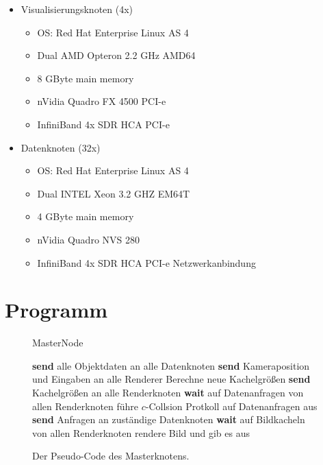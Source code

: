 \begin{itemize}
  \item Visualisierungsknoten (4x)
  \begin{itemize}
    \item OS: Red Hat Enterprise Linux AS 4
    \item Dual AMD Opteron 2.2 GHz AMD64
    \item 8 GByte main memory
    \item nVidia Quadro FX 4500 PCI-e
    \item InfiniBand 4x SDR HCA PCI-e 
  \end{itemize}
  \item Datenknoten (32x)
  \begin{itemize}
    \item OS: Red Hat Enterprise Linux AS 4
    \item Dual INTEL Xeon 3.2 GHZ EM64T
    \item 4 GByte main memory
    \item nVidia Quadro NVS 280
    \item InfiniBand 4x SDR HCA PCI-e Netzwerkanbindung
  \end{itemize}
\end{itemize}

\section{Programm}
\label{sec:impl:program}

\begin{figure*}[ttt!]
\centering
 \begin{minipage}[t]{12cm}
\begin{algorithm}[H]
  \caption{MasterNode\label{fig:impl:masternode}} 
    \begin{algorithmic} [1]
      \STATE \textbf{send} alle Objektdaten an alle Datenknoten
	\STATE \textbf{send} Kameraposition und Eingaben an alle Renderer
	  \STATE Berechne neue Kachelgrößen
	  \STATE \textbf{send} Kachelgrößen an alle Renderknoten
	\ENDIF
	\STATE \textbf{wait} auf Datenanfragen von allen Renderknoten
	\STATE führe $c$-Collsion Protkoll auf Datenanfragen aus
	\STATE \textbf{send} Anfragen an zuständige Datenknoten
	\STATE \textbf{wait} auf Bildkacheln von allen Renderknoten
	\STATE rendere Bild und gib es aus
      \ENDWHILE
    \end{algorithmic}
\end{algorithm}
 \end{minipage}
\caption{Der Pseudo-Code des Masterknotens.}
\end{figure*}

